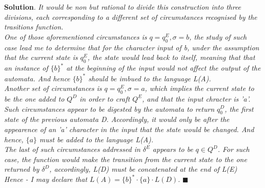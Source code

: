\documentclass[12pt]{article}
\renewcommand{\=}[1]{\stackrel{#1}{=}} %
\theoremstyle{definition}
\newenvironment{s}{%
        \begin{trivlist} \item \textbf{Solution}. }{%
            \hspace*{\fill} $\blacksquare$\end{trivlist}}%
\begin{document}
\begin{s} \newline
\emph{It would be non but rational to divide this construction into three divisions, each corresponding to a different set of circumstances recognised by the trasitions function.} \newline
\\
\emph{One of those aforementioned circumstances is $q = q_0^{E}, \sigma = b$, the study of such case lead me to determine that for the character input of b, under the assumption that the current state is $q_0^{E}$, the state would lead back to itself, meaning that that an instance of $\{b\}^{*}$ at the beginning of the input would not affect the output of the automata. And hence $\{b\}^{*}$ should be imbued to the language L(A).} \newline
\\
\emph{Another set of circumstances is $q = q_0^{E}, \sigma = a$, which implies the current state to be the one added to $Q^{D}$ in order to craft $Q^{E}$, and that the input chracter is 'a'. Such circumstances appear to be digested by the automata to return $q_0^{D}$, the first state of the previous automata D. Accordingly, it would only be after the appearence of an 'a' character in the input that the state would be changed. And hence, $\{a\}$ must be added to the language L(A).} \newline
\\
\emph{The last of such circumstances addressed in $\delta^{E}$ appears to be $q \in Q^{D}$. For such case, the function would make the transition from the current state to the one returned by $\delta^{D}$, accordingly, L(D) must be concatenated at the end of L(E)} \newline 
\\
\emph{Hence - I may declare that $L(A) = \{b\}^{*} \cdot \{a\} \cdot L(D)$.}
\end{s}
\end{document}
